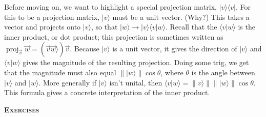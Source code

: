 \documentclass{amsbook}
\begin{document}
Before moving on, we want to highlight a special projection matrix, $|v\rangle\langle v|$.  For this to be a projection matrix, $|v\rangle$ must be a unit vector.  (Why?)  This takes a vector and projects onto $|v\rangle$, so that $|w\rangle\to|v\rangle\langle v|w\rangle$.  Recall that the $\langle v|w\rangle$ is the inner product, or dot product; this projection is sometimes written as $\operatorname{proj}_{\vec v}\vec w=\left(\vec v\dot\vec w\rangle\right)\vec v$.  Because $|v\rangle$ is a unit vector, it gives the direction of $|v\rangle$ and $\langle v|w\rangle$ gives the magnitude of the resulting projection.  Doing some trig, we get that the magnitude must also equal $\left\||w\rangle\right\|\cos\theta$, where $\theta$ is the angle between $|v\rangle$ and $|w\rangle$.  More generally if $|v\rangle$ isn't unital, then $\langle v|w\rangle=\left\|v\rangle\right\|\left\||w\rangle\right\|\cos\theta$.  This formula gives a concrete interpretation of the inner product.

{\bfseries\scshape\Large Exercises}
\end{document}
